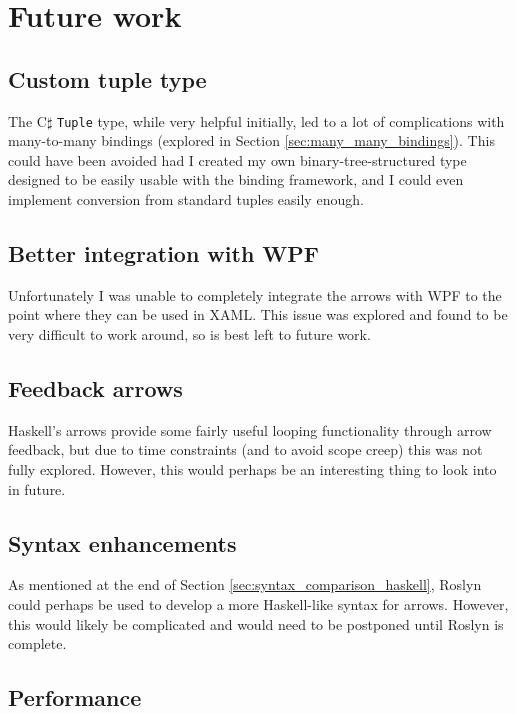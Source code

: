 \documentclass[12pt,twoside,notitlepage]{report}
\begin{document}
\section{Future work}

\subsection{Custom tuple type}

The C$\sharp$ \texttt{Tuple} type, while very helpful initially, led to a lot of complications with many-to-many bindings (explored in Section \ref{sec:many_many_bindings}). This could have been avoided had I created my own binary-tree-structured type designed to be easily usable with the binding framework, and I could even implement conversion from standard tuples easily enough.

\subsection{Better integration with WPF}

Unfortunately I was unable to completely integrate the arrows with WPF to the point where they can be used in XAML. This issue was explored and found to be very difficult to work around, so is best left to future work.

\subsection{Feedback arrows}

Haskell's arrows provide some fairly useful looping functionality through arrow feedback, but due to time constraints (and to avoid scope creep) this was not fully explored. However, this would perhaps be an interesting thing to look into in future.

\subsection{Syntax enhancements}

As mentioned at the end of Section \ref{sec:syntax_comparison_haskell}, Roslyn could perhaps be used to develop a more Haskell-like syntax for arrows. However, this would likely be complicated and would need to be postponed until Roslyn is complete.

\subsection{Performance} \label{sec:performance_enhancements}
\end{document}
